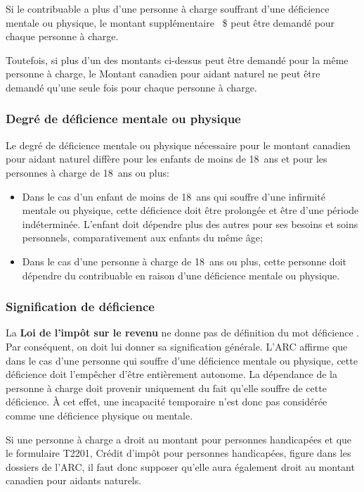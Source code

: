 Si le contribuable a plus d'une personne à charge souffrant d'une déficience mentale ou physique, le montant supplémentaire ~\$ peut être demandé pour chaque personne à charge. 

Toutefois, si plus d'un des montants ci-dessus peut être demandé pour la même personne à charge, le Montant canadien pour aidant naturel ne peut être demandé qu'une seule fois pour chaque personne à charge.

\subsubsection{Degré de déficience mentale ou physique}
Le degré de déficience mentale ou physique nécessaire pour le montant canadien pour aidant naturel diffère pour les enfants de moins de 18~ans et pour les personnes à charge de 18~ans ou plus:
\begin{itemize}
	\item Dans le cas d'un enfant de moins de 18~ans qui souffre d'une infirmité mentale ou physique, cette déficience doit être prolongée et être d'une période indéterminée. L'enfant doit dépendre plus des autres pour ses besoins et soins personnels, comparativement aux enfants du même âge;
	\item Dans le cas d'une personne à charge de 18~ans ou plus, cette personne doit dépendre du contribuable en raison d'une déficience mentale ou physique.
\end{itemize}

\subsubsection{Signification de déficience}
La \textbf{Loi de l'impôt sur le revenu} ne donne pas de définition du mot \og déficience \fg{}. Par conséquent, on doit lui donner sa signification générale.  L'ARC affirme que dans le cas d'une personne qui souffre d'une déficience mentale ou physique, cette déficience doit l'empêcher d'être entièrement autonome. La dépendance de la personne à charge doit provenir uniquement du fait qu'elle souffre de cette déficience. À cet effet, une incapacité temporaire n'est donc pas considérée comme une déficience physique ou mentale.

Si une personne à charge a droit au montant pour personnes handicapées et que le formulaire T2201, Crédit d'impôt pour personnes handicapées, figure dans les dossiers de l'ARC, il faut donc supposer qu'elle aura également droit au montant canadien pour aidants naturels. 

